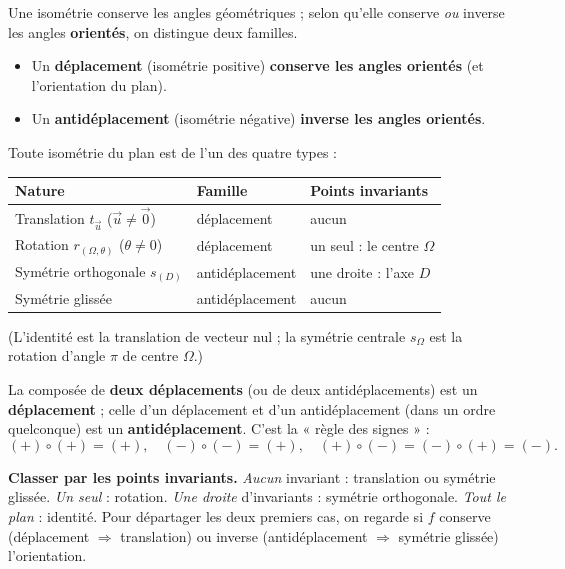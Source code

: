 Une isométrie conserve les angles géométriques ; selon qu'elle conserve \emph{ou} inverse les angles \textbf{orientés}, on distingue deux familles.

\begin{definition}
\begin{itemize}
\item Un \textbf{déplacement} (isométrie positive) \textbf{conserve les angles orientés} (et l'orientation du plan).
\item Un \textbf{antidéplacement} (isométrie négative) \textbf{inverse les angles orientés}.
\end{itemize}
\end{definition}

\begin{propriete}
Toute isométrie du plan est de l'un des quatre types :
\begin{center}\small
\begin{tabular}{@{}lll@{}}
\toprule
Nature & Famille & Points invariants\\
\midrule
Translation $t_{\vec u}$ ($\vec u\neq\vec0$) & déplacement & aucun\\
Rotation $r_{(\Omega,\theta)}$ ($\theta\neq0$) & déplacement & un seul : le centre $\Omega$\\
Symétrie orthogonale $s_{(D)}$ & antidéplacement & une droite : l'axe $D$\\
Symétrie glissée & antidéplacement & aucun\\
\bottomrule
\end{tabular}
\end{center}
(L'identité est la translation de vecteur nul ; la symétrie centrale $s_\Omega$ est la rotation d'angle $\pi$ de centre $\Omega$.)
\end{propriete}

\begin{propriete}
La composée de \textbf{deux déplacements} (ou de deux antidéplacements) est un \textbf{déplacement} ; celle d'un déplacement et d'un antidéplacement (dans un ordre quelconque) est un \textbf{antidéplacement}. C'est la « règle des signes » :
\[
(+)\circ(+)=(+),\quad (-)\circ(-)=(+),\quad (+)\circ(-)=(-)\circ(+)=(-).
\]
\end{propriete}

\begin{aretenir}
\textbf{Classer par les points invariants.} \emph{Aucun} invariant : translation ou symétrie glissée. \emph{Un seul} : rotation. \emph{Une droite} d'invariants : symétrie orthogonale. \emph{Tout le plan} : identité. Pour départager les deux premiers cas, on regarde si $f$ conserve (déplacement $\Rightarrow$ translation) ou inverse (antidéplacement $\Rightarrow$ symétrie glissée) l'orientation.
\end{aretenir}

